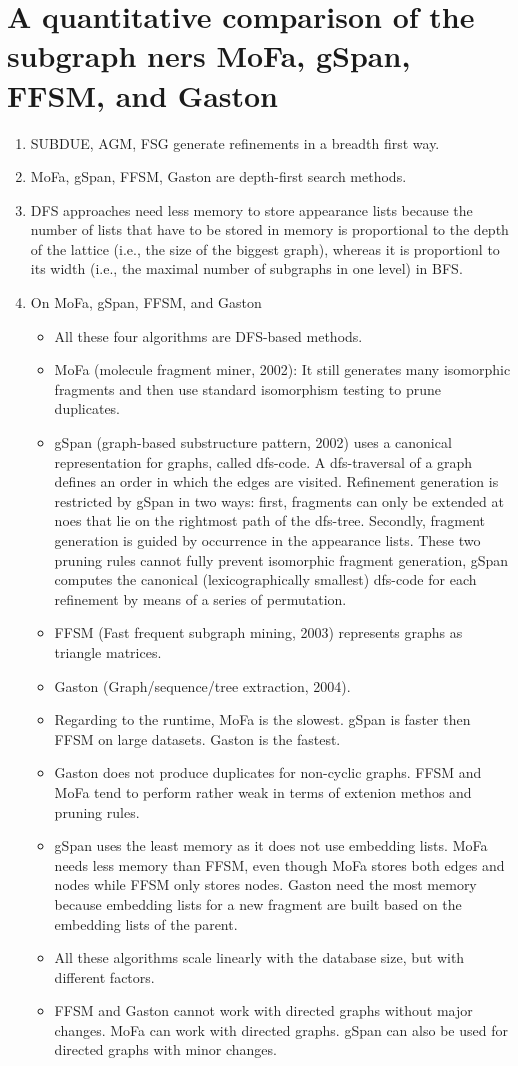\documentclass[14pt]{article}
\begin{document}
\section{A quantitative comparison of the subgraph ners MoFa, gSpan, FFSM, and Gaston}
\begin{enumerate}
 \item SUBDUE, AGM, FSG generate refinements in a breadth first way.
 \item MoFa, gSpan, FFSM, Gaston are depth-first search methods.
 \item DFS approaches need less memory to store appearance lists because the number of lists that have to be stored in memory is proportional to the depth of the lattice (i.e., the size of the biggest graph), whereas it is proportionl to its width (i.e., the maximal number of subgraphs in one level) in BFS.
 \item On MoFa, gSpan, FFSM, and Gaston
  \begin{itemize}
   \item All these four algorithms are DFS-based methods.
   \item MoFa (molecule fragment miner, 2002): It still generates many isomorphic fragments and then use standard isomorphism testing to prune duplicates.
   \item gSpan (graph-based substructure pattern, 2002) uses a canonical representation for graphs, called dfs-code. A dfs-traversal of a graph defines an order in which the edges are visited. Refinement generation is restricted by gSpan in two ways: first, fragments can only be extended at noes that lie on the rightmost path of the dfs-tree. Secondly, fragment generation is guided by occurrence in the appearance lists. These two pruning rules cannot fully prevent isomorphic fragment generation, gSpan computes the canonical (lexicographically smallest) dfs-code for each refinement by means of a series of permutation. 
   \item FFSM (Fast frequent subgraph mining, 2003) represents graphs as triangle matrices. 
   \item Gaston (Graph/sequence/tree extraction, 2004).
   \item Regarding to the runtime, MoFa is the slowest. gSpan is faster then FFSM on large datasets. Gaston is the fastest.
   \item Gaston does not produce duplicates for non-cyclic graphs. FFSM and MoFa tend to perform rather weak in terms of extenion methos and pruning rules.
   \item gSpan uses the least memory as it does not use embedding lists. MoFa needs less memory than FFSM, even though MoFa stores both edges and nodes while FFSM only stores nodes. Gaston need the most memory because embedding lists for a new fragment are built based on the embedding lists of the parent. 
   \item All these algorithms scale linearly with the database size, but with different factors.
   \item FFSM and Gaston cannot work with directed graphs without major changes. MoFa can work with directed graphs. gSpan can also be used for directed graphs with minor changes. 
  \end{itemize}
\end{enumerate}
\end{document}
